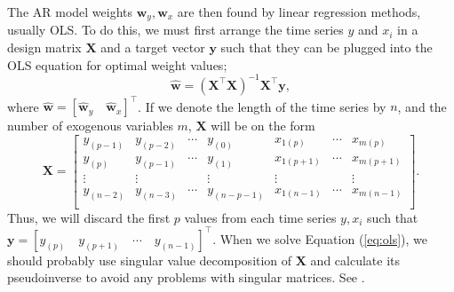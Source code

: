 \documentclass[]{article}
\begin{document}
The AR model weights $\mathbf{w}_y, \mathbf{w}_x$ are then found by linear regression methods, usually OLS. To do this, we must first arrange the time series $y$ and $x_i$ in a design matrix $\mathbf{X}$ and a target vector $\mathbf{y}$ such that they can be plugged into the OLS equation for optimal weight values;
\begin{equation} \label{eq:ols}
	\hat{\mathbf{w}} = (\mathbf{X}^\intercal \mathbf{X})^{-1} \mathbf{X}^\intercal \mathbf{y},
\end{equation}
where $\hat{\mathbf{w}} = [\hat{\mathbf{w}}_y \quad \hat{\mathbf{w}}_x]^\intercal$. If we denote the length of the time series by $n$, and the number of exogenous variables $m$, $\mathbf{X}$ will be on the form
\begin{equation}
\mathbf{X} = 
	\left[ 
	\begin{array}{ccccccc}
		y_{(p-1)} & y_{(p-2)} & \cdots & y_{(0)} & x_{1(p)} & \cdots &  x_{m(p)} \\
		y_{(p)}   & y_{(p-1)} & \cdots & y_{(1)} & x_{1(p+1)} & \cdots &  x_{m(p+1)} \\	
		\vdots  & \vdots  &          & \vdots  & \vdots   &        &  \vdots   \\
		y_{(n-2)} & y_{(n-3)} & \cdots & y_{(n-p-1)} & x_{1(n-1)} & \cdots &  x_{m(n-1)} \\			
	\end{array}
\right].
\end{equation}
Thus, we will discard the first $p$ values from each time series $y, x_i$ such that  $\mathbf{y} = [y_{(p)} \quad y_{(p+1)} \quad \cdots \quad y_{(n-1)}]^\intercal$. When we solve Equation (\ref{eq:ols}), we should probably use singular value decomposition of $\mathbf{X}$ and calculate its pseudoinverse to avoid any problems with singular matrices. See \cite{lay2016linear}.
\end{document}
